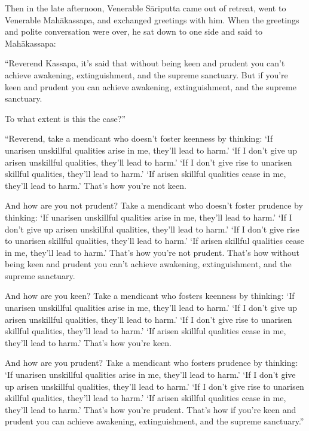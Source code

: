 \documentclass[12pt,openany]{book}%
\begin{document}
Then in the late afternoon, Venerable \textsanskrit{Sāriputta} came out of retreat, went to Venerable \textsanskrit{Mahākassapa}, and exchanged greetings with him. When the greetings and polite conversation were over, he sat down to one side and said to \textsanskrit{Mahākassapa}: 

“Reverend Kassapa, it’s said that without being keen and prudent you can’t achieve awakening, extinguishment, and the supreme sanctuary. But if you’re keen and prudent you can achieve awakening, extinguishment, and the supreme sanctuary. 

To what extent is this the case?” 

“Reverend, take a mendicant who doesn’t foster keenness by thinking: ‘If unarisen unskillful qualities arise in me, they’ll lead to harm.’ ‘If I don’t give up arisen unskillful qualities, they’ll lead to harm.’ ‘If I don’t give rise to unarisen skillful qualities, they’ll lead to harm.’ ‘If arisen skillful qualities cease in me, they’ll lead to harm.’ That’s how you’re not keen. 

And how are you not prudent? Take a mendicant who doesn’t foster prudence by thinking: ‘If unarisen unskillful qualities arise in me, they’ll lead to harm.’ ‘If I don’t give up arisen unskillful qualities, they’ll lead to harm.’ ‘If I don’t give rise to unarisen skillful qualities, they’ll lead to harm.’ ‘If arisen skillful qualities cease in me, they’ll lead to harm.’ That’s how you’re not prudent. That’s how without being keen and prudent you can’t achieve awakening, extinguishment, and the supreme sanctuary. 

And how are you keen? Take a mendicant who fosters keenness by thinking: ‘If unarisen unskillful qualities arise in me, they’ll lead to harm.’ ‘If I don’t give up arisen unskillful qualities, they’ll lead to harm.’ ‘If I don’t give rise to unarisen skillful qualities, they’ll lead to harm.’ ‘If arisen skillful qualities cease in me, they’ll lead to harm.’ That’s how you’re keen. 

And how are you prudent? Take a mendicant who fosters prudence by thinking: ‘If unarisen unskillful qualities arise in me, they’ll lead to harm.’ ‘If I don’t give up arisen unskillful qualities, they’ll lead to harm.’ ‘If I don’t give rise to unarisen skillful qualities, they’ll lead to harm.’ ‘If arisen skillful qualities cease in me, they’ll lead to harm.’ That’s how you’re prudent. That’s how if you’re keen and prudent you can achieve awakening, extinguishment, and the supreme sanctuary.” 
\end{document}
